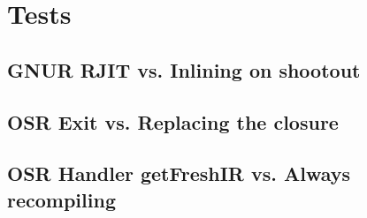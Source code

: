 \section{Tests}
\subsection{GNUR RJIT vs. Inlining on shootout}
\subsection{OSR Exit vs. Replacing the closure}
\subsection{OSR Handler getFreshIR vs. Always recompiling}


